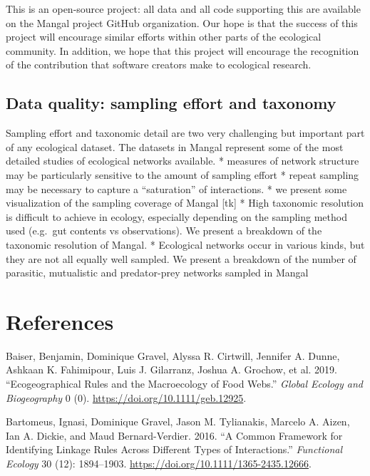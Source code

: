 This is an open-source project: all data and all code supporting this
are available on the Mangal project GitHub organization. Our hope is
that the success of this project will encourage similar efforts within
other parts of the ecological community. In addition, we hope that this
project will encourage the recognition of the contribution that software
creators make to ecological research.

\hypertarget{data-quality-sampling-effort-and-taxonomy}{%
\subsection{Data quality: sampling effort and
taxonomy}\label{data-quality-sampling-effort-and-taxonomy}}

Sampling effort and taxonomic detail are two very challenging but
important part of any ecological dataset. The datasets in Mangal
represent some of the most detailed studies of ecological networks
available. * measures of network structure may be particularly sensitive
to the amount of sampling effort * repeat sampling may be necessary to
capture a ``saturation'' of interactions. * we present some
visualization of the sampling coverage of Mangal {[}tk{]} * High
taxonomic resolution is difficult to achieve in ecology, especially
depending on the sampling method used (e.g.~gut contents vs
observations). We present a breakdown of the taxonomic resolution of
Mangal. * Ecological networks occur in various kinds, but they are not
all equally well sampled. We present a breakdown of the number of
parasitic, mutualistic and predator-prey networks sampled in Mangal

\hypertarget{references}{%
\section*{References}\label{references}}

\hypertarget{refs}{}
\leavevmode\hypertarget{ref-BaisGrav19}{}%
Baiser, Benjamin, Dominique Gravel, Alyssa R. Cirtwill, Jennifer A.
Dunne, Ashkaan K. Fahimipour, Luis J. Gilarranz, Joshua A. Grochow, et
al. 2019. ``Ecogeographical Rules and the Macroecology of Food Webs.''
\emph{Global Ecology and Biogeography} 0 (0).
\url{https://doi.org/10.1111/geb.12925}.

\leavevmode\hypertarget{ref-BartGrav16}{}%
Bartomeus, Ignasi, Dominique Gravel, Jason M. Tylianakis, Marcelo A.
Aizen, Ian A. Dickie, and Maud Bernard-Verdier. 2016. ``A Common
Framework for Identifying Linkage Rules Across Different Types of
Interactions.'' \emph{Functional Ecology} 30 (12): 1894--1903.
\url{https://doi.org/10.1111/1365-2435.12666}.

